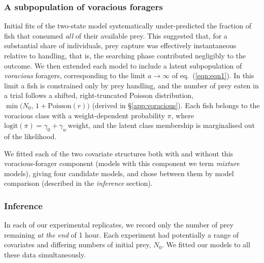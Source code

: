 \documentclass[ASNA,twocolumn]{USG} %
\begin{document}
\subsubsection{A subpopulation of voracious foragers}

Initial fits of the two-state model systematically under-predicted the fraction of fish that consumed \textit{all} of their available prey. This suggested that, for a substantial share of individuals, prey capture was effectively instantaneous relative to handling, that is, the searching phase contributed negligibly to the outcome. We then extended each model to include a latent subpopulation of \textit{voracious} foragers, corresponding to the limit \begin{math}a \to \infty\end{math} of eq.\ (\ref{eqn:eqn1}). In this limit a fish is constrained only by prey handling, and the number of prey eaten in a trial follows a shifted, right-truncated Poisson distribution, \begin{math}\min\!\big(N_0,\, 1 + \mathrm{Poisson}(r)\big)\end{math} (derived in \S\ref{app:voracious}). Each fish belongs to the voracious class with a weight-dependent probability \begin{math}\pi\end{math}, where \begin{math}\mathrm{logit}(\pi) = \gamma_0 + \gamma_w\,\mathrm{weight}\end{math}, and the latent class membership is marginalised out of the likelihood.

We fitted each of the two covariate structures both with and without this voracious-forager component (models with this component we term \textit{mixture} models), giving four candidate models, and chose between them by model comparison (described in the \textit{inference} section).

\subsubsection{Inference}
In each of our experimental replicates, we record only the number of prey remaining \textit{at the end} of 1 hour. Each experiment had potentially a range of covariates and differing numbers of initial prey, \begin{math}N_0\end{math}. We fitted our models to all these data simultaneously.
\end{document}
